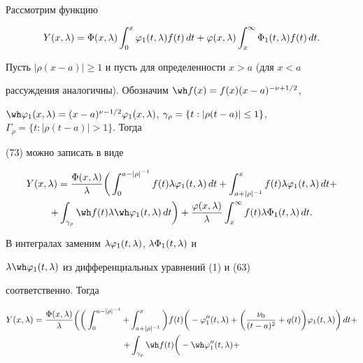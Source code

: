 \begin{pf}


Рассмотрим функцию


\begin{equation}


Y(x,\la)=\Phi(x,\la) \int_0^x \vv_1(t,\la)f(t)\,dt+


\vv(x,\la) \int_x^\infty \Phi_1(t,\la)f(t)\,dt.


\end{equation}


Пусть $|\rho(x-a)|\ge 1$ и пусть для определенности $x>a$ (для $x<a$


рассуждения аналогичны). Обозначим $\wh f(x)=f(x)(x-a)^{-\nu+1/2}$,


$\wh\vv_1(x,\la)=(x-a)^{\nu-1/2}\vv_1(x,\la)$, $\ga_{\rho}=\{t:


|\rho(t-a)|\le 1\}$, $\Gamma_{\rho}=\{t: |\rho(t-a)|> 1\}$. Тогда


(73) можно записать в виде


\begin{multline*}


Y(x,\la)= \frac{\Phi(x,\la)}{\la}\bigg( \int_0^{a-|\rho|^{-1}}f(t)


\la\vv_1(t,\la)\,dt+ \int^x_{a+|\rho|^{-1}} f(t)\la\vv_1(t,\la)\,dt + \\


%


+ \int_{\ga_{\rho}} \wh f(t)\la\wh\vv_1(t,\la)\,dt\bigg)


+ \frac{\vv(x,\la)}{\la}  \int_x^\iy f(t)\la\Phi_1(t,\la)\,dt.


\end{multline*}


В интегралах заменим $\lambda\varphi_1(t,\lambda)$, $\lambda\Phi_1(t,\lambda)$ и


$\la\wh\vv_1(t,\la)$ из дифференциальных уравнений (1) и (63)


соответственно. Тогда


\begin{multline*}


Y(x,\la)= \frac{\Phi(x,\la)}{\la}\bigg(\bigg(  \int_0^{a-|\rho|^{-1}}


+ \int^x_{a+|\rho|^{-1}}\bigg)f(t)\bigg(-\vv''_1(t,\la) +


\bigg( \frac{\nu_0}{(t-a)^2}+q(t)\bigg)\vv_1(t,\la)\bigg)\,dt + \\


%


+ \int_{\ga_{\rho}} \wh f(t)\bigg(-\wh\vv''_1(t,\la)+



\end{multline*}
\end{pf}
